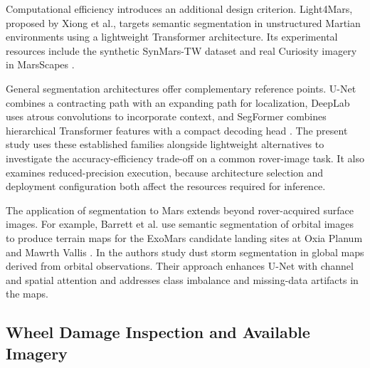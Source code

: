 Computational efficiency introduces an additional design criterion. Light4Mars, proposed by Xiong et al., targets semantic segmentation in unstructured Martian environments using a lightweight Transformer architecture. Its experimental resources include the synthetic SynMars-TW dataset and real Curiosity imagery in MarsScapes \cite{xiong2024light4mars}.

General segmentation architectures offer complementary reference points. U-Net combines a contracting path with an expanding path for localization, DeepLab uses atrous convolutions to incorporate context, and SegFormer combines hierarchical Transformer features with a compact decoding head \cite{ronneberger2015unet,chen2017deeplabv3,xie2021segformer}. The present study uses these established families alongside lightweight alternatives to investigate the accuracy-efficiency trade-off on a common rover-image task. It also examines reduced-precision execution, because architecture selection and deployment configuration both affect the resources required for inference.

The application of segmentation to Mars extends beyond rover-acquired surface images. For example, Barrett et al. use semantic segmentation of orbital images to produce terrain maps for the ExoMars candidate landing sites at Oxia Planum and Mawrth Vallis \cite{barrett2022noahh}. In \cite{venturini2025duststorms} the authors study dust storm segmentation in global maps derived from orbital observations. Their approach enhances U-Net with channel and spatial attention and addresses class imbalance and missing-data artifacts in the maps.


\subsection{Wheel Damage Inspection and Available Imagery}

